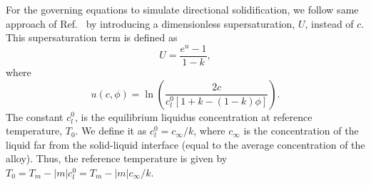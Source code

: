 \documentclass[10pt]{article}
\begin{document}
For the governing equations to simulate directional solidification, we follow same approach of Ref.~\cite{Echebarria2004} by introducing a dimensionless supersaturation, $U$, instead of $c$. This supersaturation term is defined as
\begin{equation}
U = \frac{e^u -1}{1-k},
\end{equation}
where
\begin{equation}
\label{defu}
u(c,\phi) = \ln \left( \frac{2c}{c_l^0[1+k-(1-k)\phi]}\right).
\end{equation}
The constant $c_l^0$, is the equilibrium liquidus concentration at reference temperature, $T_0$. We define it as $c_l^0  = c_\infty /k$, where $c_\infty$ is the concentration of the liquid far from the solid-liquid interface (equal to the average concentration of the alloy). Thus, the reference temperature is given by  $T_0=T_m - |m|c_l^0 =T_m-|m|c_\infty/k$.
\end{document}
